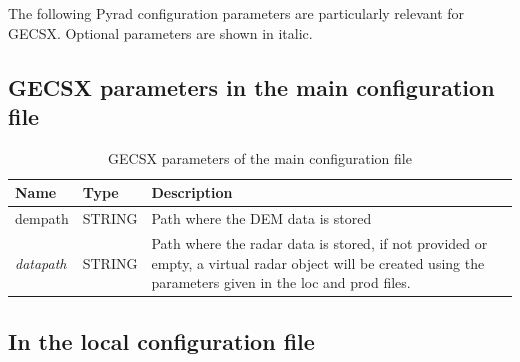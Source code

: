 \documentclass[a4paper,11pt,pdftex,twoside]{scrartcl}
\renewcommand{\bf}{\normalfont \bfseries}
\begin{document}
{{{The following Pyrad configuration parameters are particularly relevant for GECSX. Optional parameters are shown in italic.

\subsection{GECSX parameters in the main configuration file}

\begin{table}[h!]
\caption{GECSX parameters of the main configuration file}
\begin{tabular}{p{}p{}p{}}
\bf{Name}          & \bf{Type} & \bf{Description}\\
\hline
dempath & STRING & Path where the DEM data is stored\\
\textit{datapath} & STRING & Path where the radar data is stored, if not provided or empty, a virtual radar object will be created using the parameters given in the loc and prod files.\\
\end{tabular}
\end{table}

    \newpage
\subsection{In the local configuration file}

}}}
\end{document}
